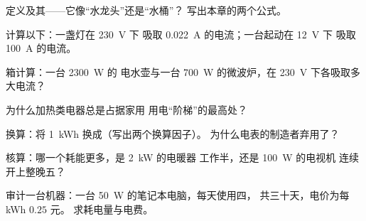 \begin{exercise}[$\star$]\label{exo:g9:electric-power-energy:1}
定义及其——它像“水龙头”还是“水桶”？
写出本章的两个公式。
\end{exercise}

\begin{exercise}[$\star$]\label{exo:g9:electric-power-energy:2}
计算以下：一盏灯在 \qty{230}{V} 下
吸取 \qty{0.022}{A} 的电流；一台起动在 \qty{12}{V} 下
吸取 \qty{100}{A} 的电流。
\end{exercise}

\begin{exercise}[$\star$]\label{exo:g9:electric-power-energy:3}
箱计算：一台 \qty{2300}{W} 的
电水壶与一台 \qty{700}{W} 的微波炉，在 \qty{230}{V} 下各吸取多大电流？
\end{exercise}

\begin{exercise}[$\star$]\label{exo:g9:electric-power-energy:4}
为什么加热类电器总是占据家用
用电“阶梯”的最高处？
\end{exercise}

\begin{exercise}[$\star$]\label{exo:g9:electric-power-energy:5}
换算：将 \qty{1}{kWh} 换成（写出两个换算因子）。
为什么电表的制造者弃用了？
\end{exercise}

\begin{exercise}[$\star$]\label{exo:g9:electric-power-energy:6}
核算：哪一个耗能更多，是 \qty{2}{kW} 的电暖器
工作半，还是 \qty{100}{W} 的电视机
连续开上整晚五？
\end{exercise}

\begin{exercise}[$\star$]\label{exo:g9:electric-power-energy:7}
审计一台机器：一台 \qty{50}{W} 的笔记本电脑，每天使用四，
共三十天，电价为每 \unit{kWh} $0.25$ 元。
求耗电量与电费。
\end{exercise}

